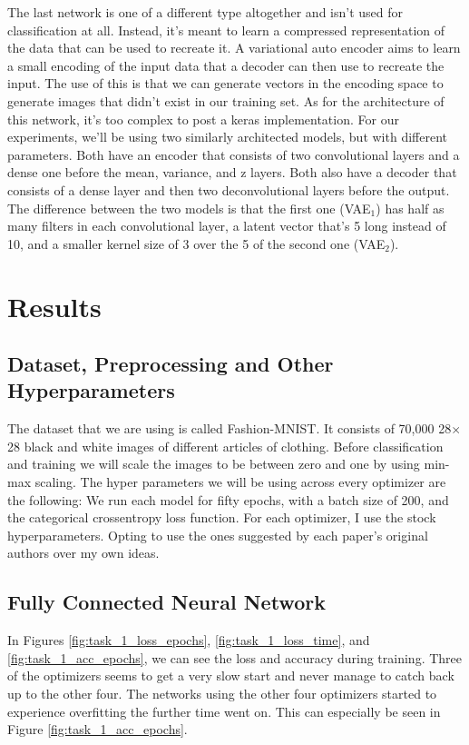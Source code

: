 \documentclass[12pt]{article}
\begin{document}
The last network is one of a different type altogether and isn't used for classification at all.
Instead, it's meant to learn a compressed representation of the data that can be used to recreate it.
A variational auto encoder aims to learn a small encoding of the input data that a decoder can then use to
 recreate the input.
The use of this is that we can generate vectors in the encoding space to generate images that didn't exist in our training set.
As for the architecture of this network, it's too complex to post a keras implementation.
For our experiments, we'll be using two similarly architected models, but with different parameters.
Both have an encoder that consists of two convolutional layers and a dense one before
 the mean, variance, and z layers.
Both also have a decoder that consists of a dense layer and then two deconvolutional layers before the output.
The difference between the two models is that the first one (VAE$_1$) has half as many filters in each convolutional layer,
 a latent vector that's 5 long instead of 10, and a smaller kernel size of 3 over the 5 of the second one (VAE$_2$).

\section{Results}

\subsection{Dataset, Preprocessing and Other Hyperparameters}

The dataset that we are using is called Fashion-MNIST.
It consists of 70,000 28$\times$28 black and white images of different articles of clothing.
Before classification and training we will scale the images to be between zero and one by using min-max scaling.
The hyper parameters we will be using across every optimizer are the following:
We run each model for fifty epochs, with a batch size of 200, and the categorical crossentropy loss function.
For each optimizer, I use the stock hyperparameters.
Opting to use the ones suggested by each paper's original authors over my own ideas.


\subsection{Fully Connected Neural Network}

In Figures \ref{fig:task_1_loss_epochs}, \ref{fig:task_1_loss_time}, and \ref{fig:task_1_acc_epochs}, we can see
 the loss and accuracy during training.
Three of the optimizers seems to get a very slow start and never manage to catch back up to the other four.
The networks using the other four optimizers started to experience overfitting the further time went on.
This can especially be seen in Figure \ref{fig:task_1_acc_epochs}.
\end{document}
